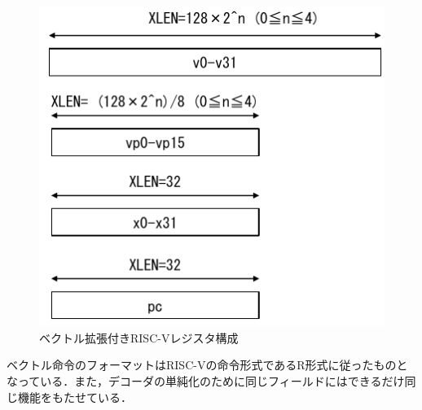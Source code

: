 \begin{figure}[tb]
    \centering
    \includegraphics[scale=1]{image/register_comp.pdf}
    \caption{ベクトル拡張付きRISC-Vレジスタ構成}
    \label{fig:reg_comp}
\end{figure}

ベクトル命令のフォーマットはRISC-Vの命令形式であるR形式に従ったものとなっている．また，デコーダの単純化のために同じフィールドにはできるだけ同じ機能をもたせている．

